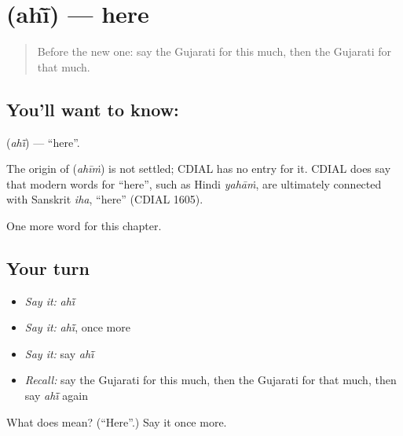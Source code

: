 \section[\texorpdfstring{\gu{અહીં} (ahī̃)}{અહીં (ahī̃)}]{ (ahī̃) — here}

\label{lesson:GU-C101-ahi}



\begin{quote}
Before the new one: say the Gujarati for this much, then the Gujarati for that much.
\end{quote}

\subsection*{You'll want to know: }
\textbf{} (\emph{ahī̃}) — \textquotedblleft{}here\textquotedblright{}.

\begin{cousinweb}
The origin of \textbf{} (\emph{ahīṁ}) is not settled; CDIAL has no entry for it. CDIAL does say that modern words for \textquotedblleft{}here\textquotedblright{}, such as Hindi \emph{yahāṁ}, are ultimately connected with Sanskrit \emph{iha}, \textquotedblleft{}here\textquotedblright{} (CDIAL 1605).
\end{cousinweb}

\begin{grammarlens}[title={What you've built}]
One more word for this chapter.
\end{grammarlens}

\subsection*{Your turn}
\begin{itemize}
\raggedright
  \item \emph{Say it:} \emph{ahī̃}
  \item \emph{Say it:} \emph{ahī̃}, once more
  \item \emph{Say it:} say \emph{ahī̃}
  \item \emph{Recall:} say the Gujarati for this much, then the Gujarati for that much, then say \emph{ahī̃} again
\end{itemize}

\begin{tcolorbox}[breakable,colback=teal!4,colframe=teal!35!black,title={Before you move on}]
What does  mean? (\textquotedblleft{}Here\textquotedblright{}.) Say it once more.
\end{tcolorbox}
